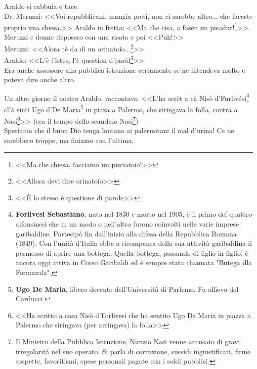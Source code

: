 \indent {}Araldo si rabbuia e tace.\\ 
\indent {}Dr. Meruzzi: <<Voi repubblicani, mangia preti, non ci sarebbe altro... che faceste proprio una chiesa.>>
\indent {}Araldo in fretta: <<Ma che cisa, a fasèn un pisadur!\footnote{<<Ma che chiesa, facciamo un pisciatoio!>>}>>.\\
\indent {}Meruzzi e donne risposero con una risata e poi <<Puh!>>\\
\indent {}Meruzzi: <<Alora té da dì un orinatoio...\footnote{<<Allora devi dire orinatoio>>}>>\\
\indent {}Araldo: <<L'è l'istes, l'è question d'paròl\footnote{<<È lo stesso è questione di parole>>}>>\\
\indent Era anche assessore alla pubblica istruzione certamente se ne intendeva molto e poteva dire anche altro.

Un altro giorno il nostro Araldo, raccontava: <<L'ha scrèt a cà Nisò d'Furlivési\footnote{\textbf{Forlivesi Sebastiano}, nato nel 1830 e morto nel 1905, è il primo dei quattro alfonsinesi che in un modo o nell'altro furono coinvolti nelle varie imprese garibaldine. Partecipò fin dall'inizio alla difesa della Repubblica Romana (1849). Con l'unità d'Italia ebbe a ricompensa della sua attività garibaldina il permesso di aprire una bottega. Quella bottega, passando di figlio in figlio, è ancora oggi attiva in Corso Garibaldi ed è sempre stata chiamata "Butega dla Formazala".} cl'à sintì Ugo d'De Maria\footnote{\textbf{Ugo De Maria}, libero docente dell'Università di Parlemo. Fu allievo del Carducci.} in piaza a Palermo, che siringava la folla, contra a Nasi\footnote{<<Ha scritto a casa Nisò d'Forlivesi che ha sentito Ugo De Maria in piazza a Palermo che siringava (per arringava) la folla>>}>> (era il tempo dello scandalo Nasi\footnote{Il Ministro della Pubblica Istruzione, Nunzio Nasi venne accusato di gravi irregolarità nel suo operato. Si parla di corruzione, sussidi ingiustificati, firme sospette, favoritismi, spese personali pagate con i soldi pubblici.})\\
\indent Speriamo che il buon Dio tenga lontano ai palermitani il mal d'urina! Ce ne sarebbero troppe, ma finiamo con l'ultima.\\

